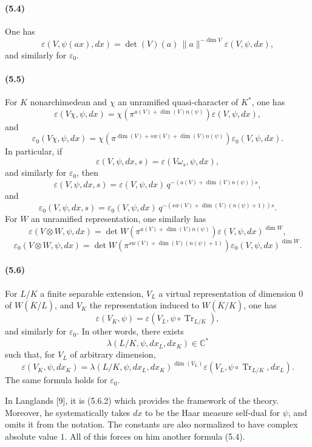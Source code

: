 \documentclass[10pt]{article}
\newcommand{\C}{\mathbb C}
\newcommand{\Tr}{\operatorname{Tr}}
\providecommand{\Tr}{\operatorname{Tr}}
\providecommand{\Tr}{\operatorname{Tr}}
\providecommand{\Tr}{\operatorname{Tr}}
\begin{document}
\paragraph{(5.4)} One has
\[
\varepsilon(V,\psi(ax),dx)
=
\det(V)(a)\,\|a\|^{-\dim V}\varepsilon(V,\psi,dx),
\]
and similarly for \(\varepsilon_0\).

\paragraph{(5.5)} For \(K\) nonarchimedean and \(\chi\) an unramified quasi-character of \(K^*\), one has
\[
\tag{5.5.1}
\varepsilon(V\chi,\psi,dx)
=
\chi\!\left(\pi^{a(V)+\dim(V)n(\psi)}\right)\varepsilon(V,\psi,dx),
\]
and
\[
\varepsilon_0(V\chi,\psi,dx)
=
\chi\!\left(\pi^{\dim(V)+sw(V)+\dim(V)n(\psi)}\right)
\varepsilon_0(V,\psi,dx).
\]
In particular, if
\[
\varepsilon(V,\psi,dx,s)=\varepsilon(V\omega_s,\psi,dx),
\]
and similarly for \(\varepsilon_0\), then
\[
\tag{5.5.2}
\varepsilon(V,\psi,dx,s)
=
\varepsilon(V,\psi,dx)\,
q^{-(a(V)+\dim(V)n(\psi))s},
\]
and
\[
\varepsilon_0(V,\psi,dx,s)
=
\varepsilon_0(V,\psi,dx)\,
q^{-(sw(V)+\dim(V)(n(\psi)+1))s}.
\]
For \(W\) an unramified representation, one similarly has
\[
\tag{5.5.3}
\varepsilon(V\otimes W,\psi,dx)
=
\det W\!\left(\pi^{a(V)+\dim(V)n(\psi)}\right)
\varepsilon(V,\psi,dx)^{\dim W},
\]
\[
\varepsilon_0(V\otimes W,\psi,dx)
=
\det W\!\left(\pi^{sw(V)+\dim(V)(n(\psi)+1)}\right)
\varepsilon_0(V,\psi,dx)^{\dim W}.
\]

\paragraph{(5.6)} For \(L/K\) a finite separable extension, \(V_L\) a virtual representation of dimension \(0\) of \(W(\overline K/L)\), and \(V_K\) the representation induced to \(W(\overline K/K)\), one has
\[
\tag{5.6.1}
\varepsilon(V_K,\psi)=\varepsilon(V_L,\psi\circ\Tr_{L/K}),
\]
and similarly for \(\varepsilon_0\). In other words, there exists
\[
\lambda(L/K,\psi,dx_L,dx_K)\in\C^*
\]
such that, for \(V_L\) of arbitrary dimension,
\[
\tag{5.6.2}
\varepsilon(V_K,\psi,dx_K)
=
\lambda(L/K,\psi,dx_L,dx_K)^{\dim(V_L)}
\varepsilon(V_L,\psi\circ\Tr_{L/K},dx_L).
\]
The same formula holds for \(\varepsilon_0\).

In Langlands [9], it is (5.6.2) which provides the framework of the theory. Moreover, he systematically takes \(dx\) to be the Haar measure self-dual for \(\psi\), and omits it from the notation. The constants are also normalized to have complex absolute value \(1\). All of this forces on him another formula (5.4).
\end{document}
